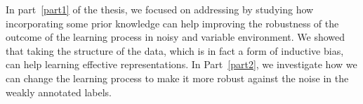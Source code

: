 \bigskip
In part~\ref{part1} of the thesis, we focused on addressing \textbf{} by studying how incorporating some prior knowledge can help improving the robustness of the outcome of the learning process in noisy and variable environment. We showed that taking the structure of the data, which is in fact a form of inductive bias, can help learning effective representations. In Part~\ref{part2}, we investigate how we can change the learning process to make it more robust against the noise in the weakly annotated labels.